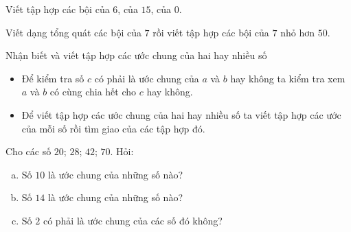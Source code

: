 \begin{vd}%
	Viết tập hợp các bội của $6$, của $15$, của $0$.
\end{vd}
\begin{vd}%
	Viết dạng tổng quát các bội của $7$ rồi viết tập hợp các bội của $7$ nhỏ hơn $50$.
\end{vd}
\begin{dang}{Nhận biết và viết tập hợp các ước chung của hai hay nhiều số}
	\begin{itemize}
		\item Để kiểm tra số $c$ có phải là ước chung của $a$ và $b$ hay không ta kiểm tra xem $a$ và $b$ có cùng chia hết cho $c$ hay không.
		\item Để viết tập hợp các ước chung của hai hay nhiều số ta viết tập hợp các ước của mỗi số rồi tìm giao của các tập hợp đó.
	\end{itemize}
\end{dang}
\setcounter{vd}{0}
\begin{vd}%
	Cho các số $20$; $28$; $42$; $70$. Hỏi:
	\begin{enumerate}[a)]
		\item Số $10$ là ước chung của những số nào?
		\item Số $14$ là ước chung của những số nào?
		\item Số $2$ có phải là ước chung của các số đó không? 
	\end{enumerate}
\end{vd}
